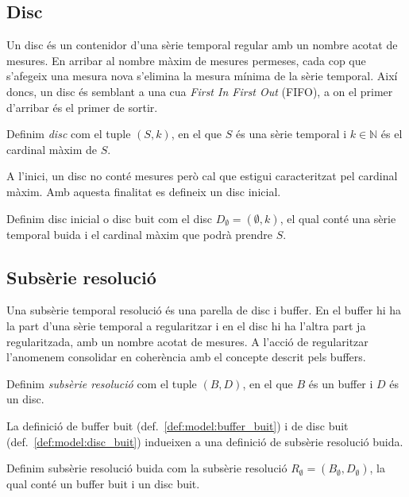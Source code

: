 \subsection{Disc}\label{sec:model:disc}

Un disc és un contenidor d'una sèrie temporal regular amb un nombre
acotat de mesures. En arribar al nombre màxim de mesures permeses,
cada cop que s'afegeix una mesura nova s'elimina la mesura mínima de
la sèrie temporal.  Així doncs, un disc és semblant a una cua
\emph{First In First Out} (FIFO), a on el primer d'arribar és el
primer de sortir.

\begin{definition}[Disc]
  Definim \emph{disc} com el tuple $(S,k)$, en el que $S$
  és una sèrie temporal i $k\in\mathbb{N}$ és el cardinal màxim de $S$.
\end{definition}

A l'inici, un disc no conté mesures però cal que estigui caracteritzat
pel cardinal màxim. Amb aquesta finalitat es defineix un disc inicial.

\begin{definition}\label{def:model:disc_buit}
  Definim disc inicial o disc buit com el disc $D_{\emptyset} =
  (\emptyset,k)$, el qual conté una sèrie temporal buida i el cardinal
  màxim que podrà prendre $S$.
\end{definition}




\subsection{Subsèrie resolució}\label{sec:model:subserie-resolucio}

Una subsèrie temporal resolució és una parella de disc i buffer. En el
buffer hi ha la part d'una sèrie temporal a regularitzar i en el disc
hi ha l'altra part ja regularitzada, amb un nombre acotat de
mesures. A l'acció de regularitzar l'anomenem consolidar en coherència
amb el concepte descrit pels buffers.


\begin{definition}
  Definim \emph{subsèrie resolució} com el tuple $(B,D)$, en el que
  $B$ és un buffer i $D$ és un disc.
\end{definition}
 
La definició de buffer buit (def.~\ref{def:model:buffer_buit}) i de
disc buit (def.~\ref{def:model:disc_buit}) indueixen a una definició
de subsèrie resolució buida.
\begin{definition}\label{def:model:subserie_resolucio_buida}
  Definim subsèrie resolució buida com la subsèrie resolució $R_{\emptyset}
  = (B_{\emptyset},D_{\emptyset})$, la qual conté un buffer buit i un
  disc buit.
\end{definition}



